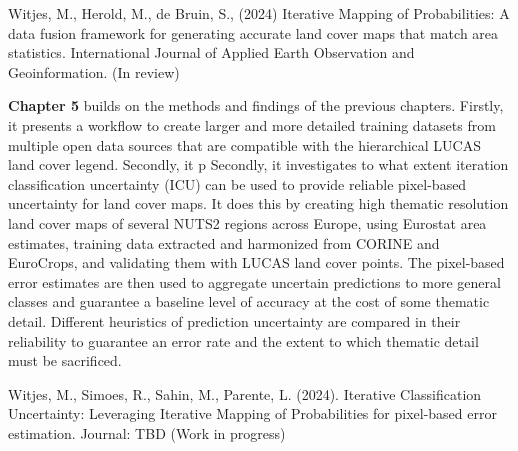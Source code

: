 Witjes, M., Herold, M., de Bruin, S., (2024) Iterative Mapping of Probabilities: A data fusion framework for generating accurate land cover maps that match area statistics. International Journal of Applied Earth Observation and Geoinformation. (In review)

\textbf{Chapter 5} builds on the methods and findings of the previous chapters. 
Firstly, it presents a workflow to create larger and more detailed training datasets from multiple open data sources that are compatible with the hierarchical LUCAS land cover legend. 
Secondly, it p
Secondly, it investigates to what extent iteration classification uncertainty (ICU) can be used to provide reliable pixel-based uncertainty for land cover maps. It does this by creating high thematic resolution land cover maps of several NUTS2 regions across Europe, using Eurostat area estimates, training data extracted and harmonized from CORINE and EuroCrops, and validating them with LUCAS land cover points. 
The pixel-based error estimates are then used to aggregate uncertain predictions to more general classes and guarantee a baseline level of accuracy at the cost of some thematic detail. Different heuristics of prediction uncertainty are compared in their reliability to guarantee an error rate and the extent to which thematic detail must be sacrificed.

Witjes, M., Simoes, R., Sahin, M., Parente, L. (2024). Iterative Classification Uncertainty: Leveraging Iterative Mapping of Probabilities for pixel-based error estimation. Journal: TBD
(Work in progress)